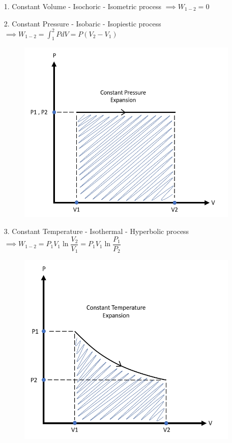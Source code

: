 \documentclass[8pt]{article}
\begin{document}
	\begin{itemize}
		\item[1.] Constant Volume - Isochoric - Isometric process $\implies \boxed{W_{1-2} = 0}$
		\item[2.] Constant Pressure - Isobaric - Isopiestic process $\implies \boxed{W_{1-2}=\int _1^2 PdV = P(V_2-V_1)}$
			\begin{figure}[H]
				\includegraphics[scale=0.3]{constpress.png} 
				\centering
			\end{figure}
		\item[3.] Constant Temperature - Isothermal - Hyperbolic process $\implies \boxed{W_{1-2} = P_1V_1\ln \dfrac{V_2}{V_1} = P_1V_1\ln \dfrac{P_1}{P_2}}$
			\begin{figure}[H]
				\includegraphics[scale=0.3]{consttemp.png} 

\end{figure}
\end{itemize}
\end{document}
